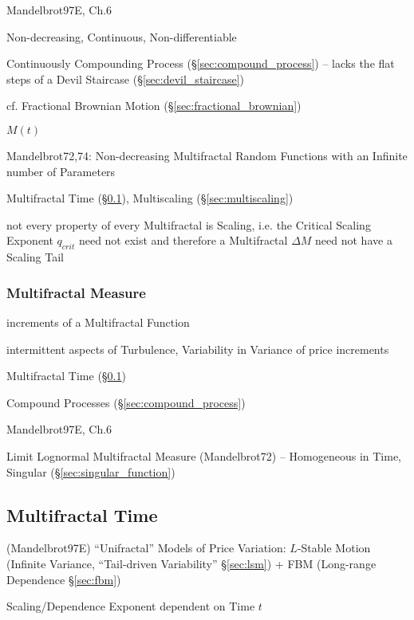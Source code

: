 Mandelbrot97E, Ch.6

Non-decreasing, Continuous, Non-differentiable

Continuously Compounding Process (\S\ref{sec:compound_process})
-- lacks the flat steps of a Devil Staircase (\S\ref{sec:devil_staircase})

cf. Fractional Brownian Motion (\S\ref{sec:fractional_brownian})

$M(t)$

Mandelbrot72,74: Non-decreasing Multifractal Random Functions with an Infinite
number of Parameters

Multifractal Time (\S\ref{sec:multifractal_time}), Multiscaling
(\S\ref{sec:multiscaling})

not every property of every Multifractal is Scaling, i.e. the Critical Scaling
Exponent $q_{crit}$ need not exist and therefore a Multifractal $\Delta M$ need
not have a Scaling Tail



\subsubsection{Multifractal Measure}\label{sec:multifractal_measure}

increments of a Multifractal Function

intermittent aspects of Turbulence, Variability in Variance of price increments

Multifractal Time (\S\ref{sec:multifractal_time})

Compound Processes (\S\ref{sec:compound_process})

Mandelbrot97E, Ch.6

Limit Lognormal Multifractal Measure (Mandelbrot72) -- Homogeneous in Time,
Singular (\S\ref{sec:singular_function})



\subsection{Multifractal Time}\label{sec:multifractal_time}

(Mandelbrot97E) ``Unifractal'' Models of Price Variation: $L$-Stable Motion
(Infinite Variance, ``Tail-driven Variability'' \S\ref{sec:lsm}) + FBM
(Long-range Dependence \S\ref{sec:fbm})

Scaling/Dependence Exponent dependent on Time $t$

